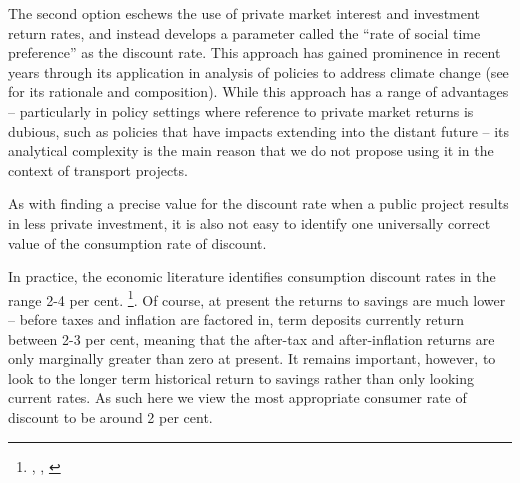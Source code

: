 The second option eschews the use of private market interest and investment return rates, and instead develops a parameter called the ``rate of social time preference'' as the discount rate. This approach has gained prominence in recent years through its application in analysis of policies to address climate change (see  for its rationale and composition). While this approach has a range of advantages -- particularly in policy settings where reference to private market returns is dubious, such as policies that have impacts extending into the distant future -- its analytical complexity is the main reason that we do not propose using it in the context of transport projects. 

As with finding a precise value for the discount rate when a public project results in less private investment, it is also not easy to identify one universally correct value of the consumption rate of discount. 

In practice, the economic literature identifies consumption discount rates in the range 2-4 per cent.%
    \footnote{\textcite{Boardman-Cost-Benefit-Analysis-4th-Edition}, \textcite{Harrison-Valuing-the-Future}, \textcite{Parker-2009-NZTA-discount-rates}}. 
Of course, at present the returns to savings are much lower -- before taxes and inflation are factored in, term deposits currently return between 2-3 per cent, meaning that the after-tax and after-inflation returns are only marginally greater than zero at present. It remains important, however, to look to the longer term historical return to savings rather than only looking current rates. As such here we view the most appropriate consumer rate of discount to be around 2 per cent.



